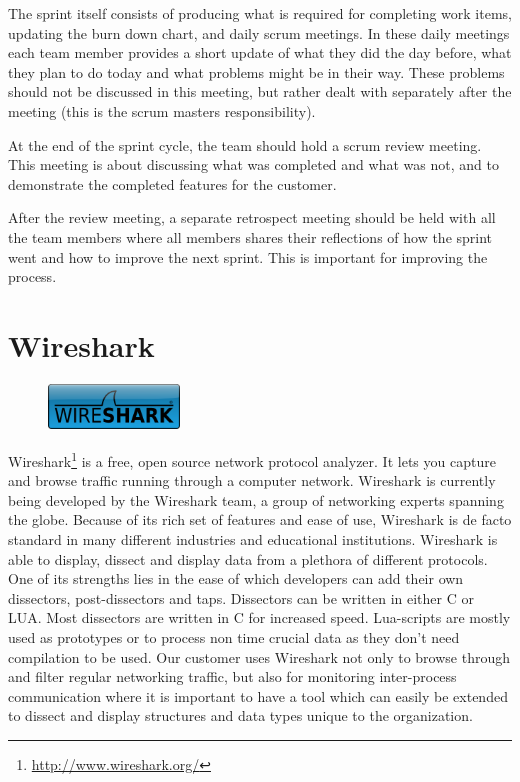 The sprint itself consists of producing what is required for completing work
items, updating the burn down chart, and daily scrum meetings. In these daily
meetings each team member provides a short update of what they did the day
before, what they plan to do today and what problems might be in their way.
These problems should not be discussed in this meeting, but rather dealt with
separately after the meeting (this is the scrum masters responsibility).

At the end of the sprint cycle, the team should hold a scrum review meeting.
This meeting is about discussing what was completed and what was not, and to
demonstrate the completed features for the customer.

After the review meeting, a separate retrospect meeting should be held with all
the team members where all members shares their reflections of how the sprint
went and how to improve the next sprint. This is important for improving the
process.


\section{Wireshark}
\label{sec:pre:wireshark}
\begin{figure}
	\begin{center}
	\vspace{-30pt}
		\includegraphics[width=3.5cm]{./planning/img/wireshark_logo}
	\vspace{-30pt}
	\end{center}
\end{figure}
Wireshark\footnote{\url{http://www.wireshark.org/}} is a free, open source
network protocol analyzer. It lets you capture
and browse traffic running through a computer network. Wireshark is currently
being developed by the Wireshark team, a group of networking experts spanning
the globe. Because of its rich set of features and ease of use, Wireshark is de
facto standard in many different industries and educational institutions.
Wireshark is able to display, dissect and display data from a plethora of
different protocols. One of its strengths lies in the ease of which developers
can add their own dissectors, post-dissectors and taps. Dissectors can be
written in either C or LUA. Most dissectors are written in C for increased
speed. Lua-scripts are mostly used as prototypes or to process non time crucial
data as they don't need compilation to be used. Our customer uses Wireshark not
only to browse through and filter regular networking traffic, but also for
monitoring inter-process communication where it is important to have a tool
which can easily be extended to dissect and display structures and data types
unique to the organization.


